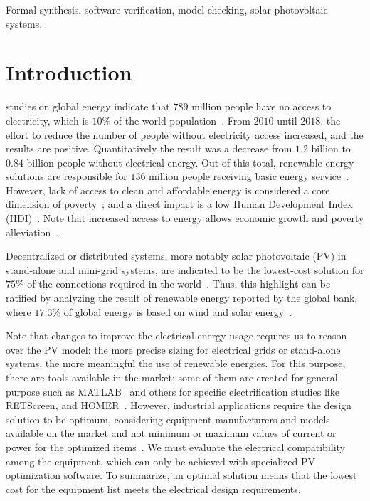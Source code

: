 \documentclass[journal]{IEEEtran}
\begin{document}
\begin{IEEEkeywords}
Formal synthesis, software verification, model checking, solar photovoltaic systems.
\end{IEEEkeywords}
\IEEEpeerreviewmaketitle

\section{Introduction}
 studies on global energy indicate that $789$ million people have no access to electricity, which is $10$\% of the world population~\cite{Energyprogressreport}. From $2010$ until $2018$, the effort to reduce the number of people without electricity access increased, and the results are positive. Quantitatively the result was a decrease from $1.2$ billion to $0.84$ billion people without electrical energy. Out of this total, renewable energy solutions are responsible for $136$ million people receiving basic energy service~\cite{Energyprogressreport}. However, lack of access to clean and affordable energy is considered a core dimension of poverty~\cite{Hussein2012}; and a direct impact is a low Human Development Index (HDI)~\cite{Coelho}. Note that increased access to energy allows economic growth and poverty alleviation~\cite{Karekesi}. 
 
Decentralized or distributed systems, more notably solar photovoltaic (PV) in stand-alone and mini-grid systems, are indicated to be the lowest-cost solution for $75$\% of the connections required in the world~\cite {Hussein2012}. Thus, this highlight can be ratified by analyzing the result of renewable energy reported by the global bank, where $17.3$\% of global energy is based on wind and solar energy~\cite{Energyprogressreport}. 

Note that changes to improve the electrical energy usage requires us to reason over the PV model: the more precise sizing for electrical grids or stand-alone systems, the more meaningful the use of renewable energies. For this purpose, there are tools available in the market; some of them are created for general-purpose such as MATLAB~\cite{Benatiallah2017} and others for specific electrification studies like RETScreen, and HOMER~\cite{Pradhan,Swarnkar}. However, industrial applications require the design solution to be optimum, considering equipment manufacturers and models available on the market and not minimum or maximum values of current or power for the optimized items~\cite{DBLP:journals/corr/abs-1909-13139, Applasamy2011}. We must evaluate the electrical compatibility among the equipment, which can only be achieved with specialized PV optimization software. To summarize, an optimal solution means that the lowest cost for the equipment list meets the electrical design requirements.
 
\end{document}
